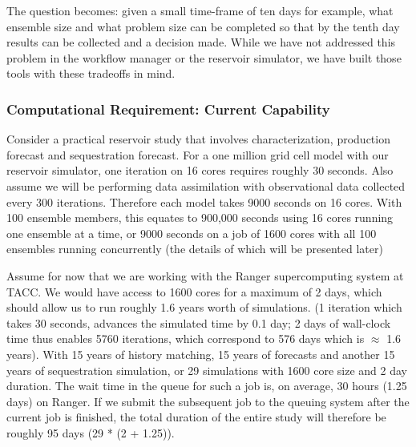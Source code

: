 \documentclass{acm_proc_article-sp}
\newcommand{\up}{\vspace*{-0.3em}}
\begin{document}
The question becomes: given a small
time-frame of ten days for example, what ensemble size and what
problem size can be completed so that by the tenth day results can be
collected and a decision made. While we have not addressed this
problem in the workflow manager or the reservoir simulator, we have
built those tools with these tradeoffs in mind.

\up\up\up\up
\subsubsection{Computational Requirement: Current Capability}

Consider a practical reservoir study that involves characterization,
production forecast and sequestration forecast. For a one million grid
cell model with our reservoir simulator, one iteration on 16 cores
requires roughly 30 seconds. Also assume we will be performing data
assimilation with observational data collected every 300 iterations.
Therefore each model takes 9000 seconds on 16 cores. With 100 ensemble
members, this equates to 900,000 seconds using 16 cores running one
ensemble at a time, or 9000 seconds on a job of 1600 cores with all 100
ensembles running concurrently (the details of which will be presented
later)

Assume for now that we are working with the Ranger supercomputing
system at TACC. We would have access to 1600 cores for a maximum of 2
days, which should allow us to run roughly 1.6 years worth of
simulations. (1 iteration which takes 30 seconds, advances the
simulated time by 0.1 day; 2 days of wall-clock time thus enables 5760
iterations, which correspond to 576 days which is $\approx$ 1.6
years). With 15 years of history matching, 15 years of forecasts and
another 15 years of sequestration simulation, or 29 simulations with
1600 core size and 2 day duration. The wait time in the queue for such
a job is, on average, 30 hours (1.25 days) on Ranger. If we submit the
subsequent job to the queuing system after the current job is
finished, the total duration of the entire study will therefore be
roughly 95 days (29 * (2 + 1.25)).
\end{document}
